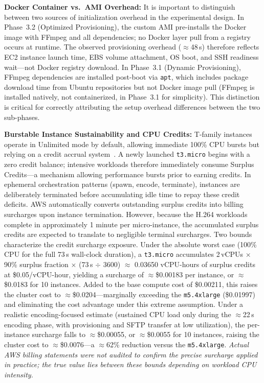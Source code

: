 \documentclass[conference]{IEEEtran}
\begin{document}
\textbf{Docker Container vs.\ AMI Overhead:} It is important to distinguish between two sources of initialization overhead in the experimental design. In Phase~3.2 (Optimized Provisioning), the custom AMI pre-installs the Docker image with FFmpeg and all dependencies; no Docker layer pull from a registry occurs at runtime. The observed provisioning overhead ($\approx$48\,s) therefore reflects EC2 instance launch time, EBS volume attachment, OS boot, and SSH readiness wait---not Docker registry download. In Phase~3.1 (Dynamic Provisioning), FFmpeg dependencies are installed post-boot via \texttt{apt}, which includes package download time from Ubuntu repositories but not Docker image pull (FFmpeg is installed natively, not containerized, in Phase~3.1 for simplicity). This distinction is critical for correctly attributing the setup overhead differences between the two sub-phases.

\textbf{Burstable Instance Sustainability and CPU Credits:} T-family instances
operate in Unlimited mode by default, allowing immediate 100\% CPU bursts but
relying on a credit accrual system~\cite{awscredits}. A newly launched
\texttt{t3.micro} begins with a zero credit balance; intensive workloads
therefore immediately consume Surplus Credits---a mechanism allowing
performance bursts prior to earning credits. In ephemeral orchestration
patterns (spawn, encode, terminate), instances are deliberately terminated
before accumulating idle time to repay these credit deficits. AWS
automatically converts outstanding surplus credits into billing surcharges upon
instance termination. However, because the H.264 workloads complete in
approximately 1 minute per micro-instance, the accumulated surplus credits
are expected to translate to negligible terminal surcharges. Two bounds characterize the credit surcharge exposure. Under the absolute worst case (100\% CPU for the full 73\,s wall-clock duration), a \texttt{t3.micro} accumulates 2\,vCPUs $\times$ 90\% surplus fraction $\times$ (73\,s $\div$ 3600) $\approx$ 0.03650 vCPU-hours of surplus credits at \$0.05/vCPU-hour, yielding a surcharge of $\approx$\$0.00183 per instance, or $\approx$\$0.0183 for 10 instances. Added to the base compute cost of \$0.00211, this raises the cluster cost to $\approx$\$0.0204---marginally exceeding the \texttt{m5.4xlarge} (\$0.01997) and eliminating the cost advantage under this extreme assumption. Under a realistic encoding-focused estimate (sustained CPU load only during the $\approx$22\,s encoding phase, with provisioning and SFTP transfer at low utilization), the per-instance surcharge falls to $\approx$\$0.00055, or $\approx$\$0.0055 for 10 instances, raising the cluster cost to $\approx$\$0.0076---a $\approx$62\% reduction versus the \texttt{m5.4xlarge}. \textit{Actual AWS billing statements were not audited to confirm the precise surcharge applied in practice; the true value lies between these bounds depending on workload CPU intensity.}
\end{document}
